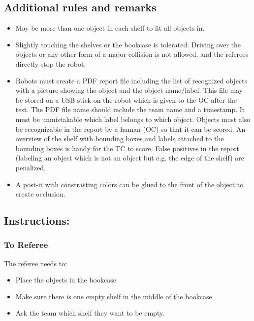 \subsection*{Additional rules and remarks}
\begin{itemize}[nosep]
	\item May be more than one object in each shelf to fit all objects in.
	\item Slightly touching the shelves or the bookcase is tolerated. Driving over the objects or any other form of a major collision is not allowed, and the referees directly stop the robot.
	\item Robots must create a PDF report file including the list of recognized objects with a picture showing the object and the object name/label. This file may be stored on a USB-stick on the robot which is given to the OC after the test. The PDF file name should include the team name and a timestamp. It must be unmistakable which label belongs to which object. Objects must also be recognizable in the report by a human (OC) so that it can be scored. An overview of the shelf with bounding boxes and labels attached to the bounding boxes is handy for the TC to score. False positives in the report (labeling an object which is not an object but e.g. the edge of the shelf) are penalized.
	\item A post-it with constrasting colors can be glued to the front of the object to create occlusion.
\end{itemize}

\subsection*{Instructions:}
\subsubsection*{To Referee}

The referee needs to:
\begin{itemize}
	\item Place the objects in the bookcase
	\item Make sure there is one empty shelf in the middle of the bookcase. 
	\item Ask the team which shelf they want to be empty.
\end{itemize}

